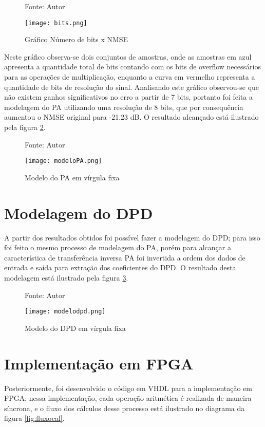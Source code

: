 \begin{figure}[htbp!]
    \centering
    \captionsetup{justification=centering}
    \caption*{Fonte: Autor}
    \texttt{[image: bits.png]}
    \caption{Gráfico Número de bits x NMSE}
    \label{fig:bits}
\end{figure}

Neste gráfico observa-se dois conjuntos de amostras, onde as amostras em azul apresenta a quantidade total de bits contando com os bits de overflow necessários para as operações de multiplicação, enquanto a curva em vermelho representa a quantidade de bits de resolução do sinal. Analisando este gráfico observou-se que não existem ganhos significativos no erro a partir de 7 bits, portanto foi feita a modelagem do PA utilizando uma resolução de 8 bits, que por consequência aumentou o NMSE original para -21.23 dB. O resultado alcançado está ilustrado pela figura \ref{fig:modelopa}.

\begin{figure}[htbp!]
    \centering
    \captionsetup{justification=centering}
    \caption*{Fonte: Autor}
    \texttt{[image: modeloPA.png]}
    \caption{Modelo do PA em vírgula fixa}
    \label{fig:modelopa}
\end{figure}

\section{Modelagem do DPD}
A partir dos resultados obtidos foi possível fazer a modelagem do DPD; para isso foi feito o mesmo processo de modelagem do PA, porém para alcançar a característica de transferência inversa PA foi invertida a ordem dos dados de entrada e saída para extração dos coeficientes do DPD. O resultado desta modelagem está ilustrado pela figura \ref{fig:modelodpd}.

\begin{figure}[htbp!]
    \centering
    \captionsetup{justification=centering}
    \caption*{Fonte: Autor}
    \texttt{[image: modelodpd.png]}
    \caption{Modelo do DPD em vírgula fixa}
    \label{fig:modelodpd}
\end{figure}

\section{Implementação em FPGA}
Posteriormente, foi desenvolvido o código em VHDL para a implementação em FPGA; nessa implementação, cada operação aritmética é realizada de maneira síncrona, e o fluxo dos cálculos desse processo está ilustrado no diagrama da figura \ref{fig:fluxocal}.

